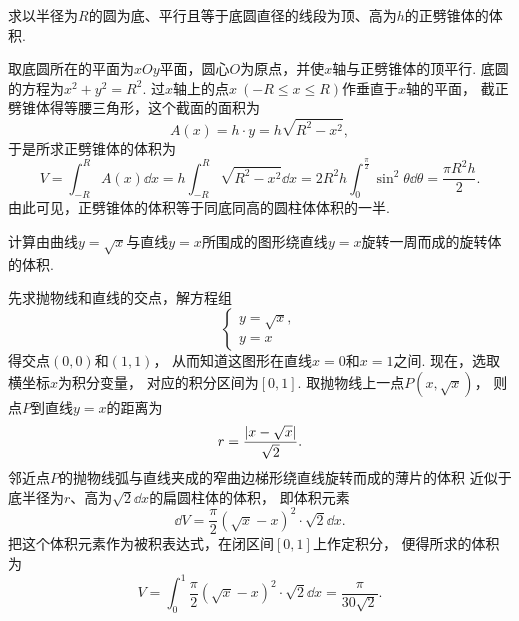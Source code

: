 \begin{example}
求以半径为\(R\)的圆为底、平行且等于底圆直径的线段为顶、高为\(h\)的正劈锥体的体积.
\begin{solution}
取底圆所在的平面为\(xOy\)平面，圆心\(O\)为原点，并使\(x\)轴与正劈锥体的顶平行.
底圆的方程为\(x^2+y^2=R^2\).
过\(x\)轴上的点\(x\ (-R \leq x \leq R)\)作垂直于\(x\)轴的平面，
截正劈锥体得等腰三角形，这个截面的面积为\begin{equation*}
	A(x) = h \cdot y = h \sqrt{R^2-x^2},
\end{equation*}
于是所求正劈锥体的体积为\begin{equation*}
	V = \int_{-R}^R A(x) \dd{x}
	= h \int_{-R}^R \sqrt{R^2-x^2} \dd{x}
	= 2 R^2 h \int_0^{\frac\pi2} \sin^2\theta \dd{\theta}
	= \frac{\pi R^2 h}2.
\end{equation*}
由此可见，正劈锥体的体积等于同底同高的圆柱体体积的一半.
\end{solution}
\end{example}

\begin{example}
计算由曲线\(y=\sqrt{x}\)与直线\(y=x\)所围成的图形绕直线\(y=x\)旋转一周而成的旋转体的体积.
\begin{solution}
先求抛物线和直线的交点，解方程组\begin{equation*}
	\left\{ \begin{array}{l}
		y=\sqrt{x}, \\
		y=x
	\end{array} \right.
\end{equation*}得交点\((0,0)\)和\((1,1)\)，
从而知道这图形在直线\(x=0\)和\(x=1\)之间.
现在，选取横坐标\(x\)为积分变量，
对应的积分区间为\([0,1]\).
取抛物线上一点\(P(x,\sqrt{x})\)，
则点\(P\)到直线\(y=x\)的距离为\begin{equation*}
	r = \frac{\abs{x-\sqrt{x}}}{\sqrt2}.
\end{equation*}
邻近点\(P\)的抛物线弧与直线夹成的窄曲边梯形绕直线旋转而成的薄片的体积
近似于底半径为\(r\)、高为\(\sqrt2 \dd{x}\)的扁圆柱体的体积，
即体积元素\begin{equation*}
	\dd{V} = \frac\pi2 (\sqrt{x}-x)^2 \cdot \sqrt2 \dd{x}.
\end{equation*}
把这个体积元素作为被积表达式，在闭区间\([0,1]\)上作定积分，
便得所求的体积为\begin{equation*}
	V = \int_0^1 \frac\pi2 (\sqrt{x}-x)^2 \cdot \sqrt2 \dd{x}
	= \frac\pi{30\sqrt2}.
\end{equation*}
\end{solution}
\end{example}


